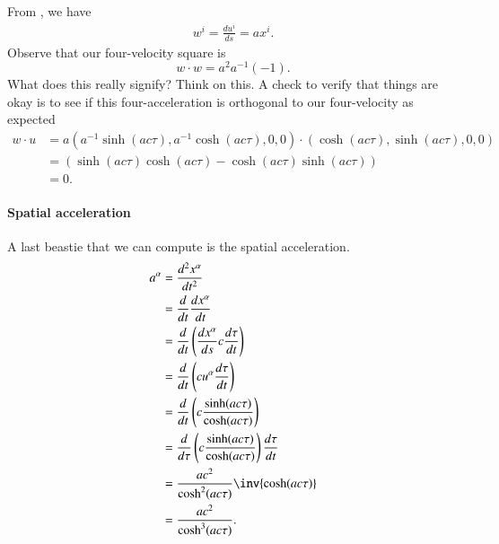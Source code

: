 {%
%
From , we have
%
\begin{equation}\label{eqn:relativisticElectrodynamicsT2:2160}
\begin{aligned}
w^i = \frac{ du^i }{ds} = a x^i.
\end{aligned}
\end{equation}
%
Observe that our four-velocity square is
%
\begin{equation}\label{eqn:relativisticElectrodynamicsT2:78}
w \cdot w = a^2 a^{-1} (-1).
\end{equation}
%
What does this really signify?  Think on this.  A check to verify that things are okay is to see if this four-acceleration is orthogonal to our four-velocity as expected
%
\begin{equation}\label{eqn:relativisticElectrodynamicsT2:2180}
\begin{aligned}
w \cdot u
&=
a ( a^{-1} \sinh( a c \tau), a^{-1} \cosh( a c \tau ), 0, 0 ) \cdot ( \cosh( a c \tau ), \sinh( a c \tau ), 0, 0) \\
&=
( \sinh(a c \tau)\cosh(a c \tau) - \cosh(a c \tau) \sinh(a c \tau) ) \\
&=
0.
\end{aligned}
\end{equation}
%
\paragraph{Spatial acceleration}

A last beastie that we can compute is the spatial acceleration.
%
\begin{equation}\label{eqn:relativisticElectrodynamicsT2:2200}
\begin{aligned}
a^\alpha
&= \frac{d^2 x^\alpha}{dt^2} \\
&= \frac{d}{dt} \frac{dx^\alpha}{dt} \\
&= \frac{d}{dt} \left( \frac{dx^\alpha}{ds} c \frac{d\tau}{dt} \right) \\
&= \frac{d}{dt} \left( c u^\alpha \frac{d\tau}{dt} \right) \\
&= \frac{d}{dt} \left( c \frac{\sinh(a c \tau)}{\cosh(a c \tau)} \right) \\
&= \frac{d}{d\tau} \left( c \frac{\sinh(a c \tau)}{\cosh(a c \tau)} \right) \frac{d\tau}{dt} \\
&= \frac{a c^2}{\cosh^2(a c \tau)} \inv{\cosh(a c \tau) } \\
&= \frac{a c^2}{\cosh^3(a c \tau)}.
\end{aligned}
\end{equation}
%
}
